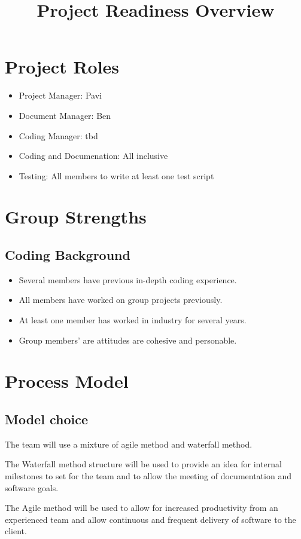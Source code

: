 \documentclass[11pt, letterpaper]{article}
\title{Project Readiness Overview}
\begin{document}
\maketitle

\section{Project Roles}

\begin{itemize}
\item Project Manager: Pavi
\item Document Manager: Ben 
\item Coding Manager: tbd
\item Coding and Documenation: All inclusive
\item Testing: All members to write at least one test script
\end{itemize}


\section{Group Strengths}
\subsection{Coding Background}
\begin{itemize}
\item Several members have previous in-depth coding experience.
\item All members have worked on group projects previously.
\item At least one member has worked in industry for several years.
\item Group members' are attitudes are cohesive and personable.
\end{itemize}

\section{Process Model}
\subsection{Model choice}
The team will use a mixture of agile method and waterfall method.\par
The Waterfall method structure will be used to provide an idea for internal milestones to set for the team and 
to allow the meeting of documentation and software goals.\par
The Agile method will be used to allow for increased productivity from an experienced team 
and allow continuous and frequent delivery of software to the client.
\end{document}

